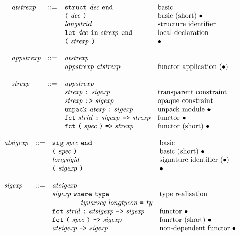 \documentclass[twoside,titlepage]{article}
\begin{document}
\begin{appendix}
  $$
  \begin{array}{llll}
  \mathit{atstrexp} & ::= & {\tt{struct}}~\mathit{dec}~{\tt{end}} & \textrm{basic} \\
  && \mbox{\tt(}~\mathit{dec}~\mbox{\tt)} & \textrm{basic (short) $\bullet$} \\
  && \mathit{longstrid} & \textrm{structure identifier} \\
  && {\tt{let}}~\mathit{dec}~{\tt{in}}~\mathit{strexp}~{\tt{end}} & \textrm{local declaration} \\
  && \mbox{\tt(}~\mathit{strexp}~\mbox{\tt)} & \textrm{$\bullet$} \\
  \\
  \mathit{appstrexp} & ::= & \mathit{atstrexp} \\
  && \mathit{appstrexp}~\mathit{atstrexp} & \textrm{functor application $(\bullet)$} \\
  \\
  \mathit{strexp} & ::= & \mathit{appstrexp} \\
  && \mathit{strexp}~\mbox{\tt:}~\mathit{sigexp} & \textrm{transparent constraint} \\
  && \mathit{strexp}~\mbox{\tt:>}~\mathit{sigexp} & \textrm{opaque constraint} \\
  && {\tt{unpack}}~\mathit{atexp}~\mbox{\tt:}~\mathit{sigexp} & \textrm{unpack module $\bullet$} \\
  && {\tt{fct}}~\mathit{strid}~\mbox{\tt:}~\mathit{sigexp}~\mbox{\tt=>}~\mathit{strexp} & \textrm{functor $\bullet$} \\
  && {\tt{fct}}~\mbox{\tt(}~\mathit{spec}~\mbox{\tt)}~\mbox{\tt=>}~\mathit{strexp} & \textrm{functor (short) $\bullet$} \\
  \end{array}
  $$

  $$
  \begin{array}{llll}
  \mathit{atsigexp} & ::= & {\tt{sig}}~\mathit{spec}~{\tt{end}} & \textrm{basic} \\
  && \mbox{\tt(}~\mathit{spec}~\mbox{\tt)} & \textrm{basic (short) $\bullet$} \\
  && \mathit{longsigid} & \textrm{signature identifier $(\bullet)$} \\
  && \mbox{\tt(}~\mathit{sigexp}~\mbox{\tt)} & \textrm{$\bullet$} \\
  \\
  \mathit{sigexp} & ::= & \mathit{atsigexp} \\
  && \mathit{sigexp}~{\tt{where}}~{\tt{type}} & \textrm{type realisation} \\
  && ~~~~~~~~~~~~\mathit{tyvarseq}~\mathit{longtycon}~\mbox{\tt=}~\mathit{ty} \\
  && {\tt{fct}}~\mathit{strid}~\mbox{\tt:}~\mathit{atsigexp}~\mbox{\tt->}~\mathit{sigexp} & \textrm{functor $\bullet$} \\
  && {\tt{fct}}~\mbox{\tt(}~\mathit{spec}~\mbox{\tt)}~\mbox{\tt->}~\mathit{sigexp} & \textrm{functor (short) $\bullet$} \\
  && \mathit{atsigexp}~\mbox{\tt->}~\mathit{sigexp} & \textrm{non-dependent functor $\bullet$} \\
  \end{array}
  $$


\end{appendix}
\end{document}
